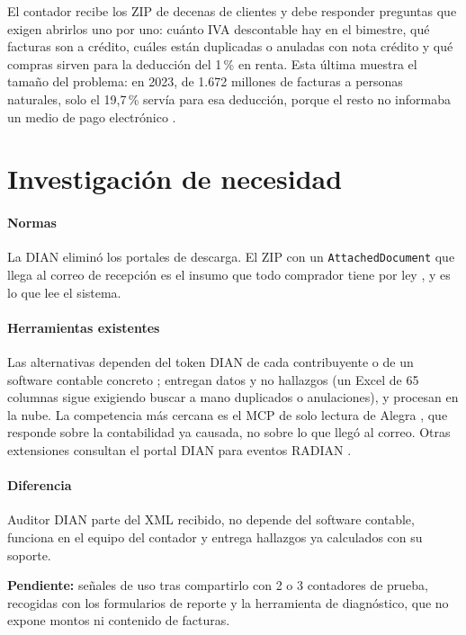 \documentclass[conference,a4paper]{IEEEtran}
\newcommand{\pendiente}[1]{\textcolor{red!70!black}{\textbf{Pendiente:} #1}}
\newcommand{\cod}[1]{\texttt{\small #1}}
\begin{document}
El contador recibe los ZIP de decenas de clientes y debe responder preguntas que exigen abrirlos uno por uno: cuánto IVA descontable hay en el bimestre, qué facturas son a crédito, cuáles están duplicadas o anuladas con nota crédito y qué compras sirven para la deducción del 1\,\% en renta. Esta última muestra el tamaño del problema: en 2023, de 1.672 millones de facturas a personas naturales, solo el 19,7\,\% servía para esa deducción, porque el resto no informaba un medio de pago electrónico \cite{dian021}.

\section{Investigación de necesidad}

\paragraph*{Normas} La DIAN eliminó los portales de descarga. El ZIP con un \cod{AttachedDocument} que llega al correo de recepción es el insumo que todo comprador tiene por ley \cite{res165,res227,dianRecepcion}, y es lo que lee el sistema.

\paragraph*{Herramientas existentes} Las alternativas dependen del token DIAN de cada contribuyente o de un software contable concreto \cite{consultorContable,siigo2026}; entregan datos y no hallazgos (un Excel de 65 columnas sigue exigiendo buscar a mano duplicados o anulaciones), y procesan en la nube. La competencia más cercana es el MCP de solo lectura de Alegra \cite{alegra2026}, que responde sobre la contabilidad ya causada, no sobre lo que llegó al correo. Otras extensiones consultan el portal DIAN para eventos RADIAN \cite{accounter}.

\paragraph*{Diferencia} Auditor DIAN parte del XML recibido, no depende del software contable, funciona en el equipo del contador y entrega hallazgos ya calculados con su soporte.

\pendiente{señales de uso tras compartirlo con 2 o 3 contadores de prueba, recogidas con los formularios de reporte y la herramienta de diagnóstico, que no expone montos ni contenido de facturas.}
\end{document}
